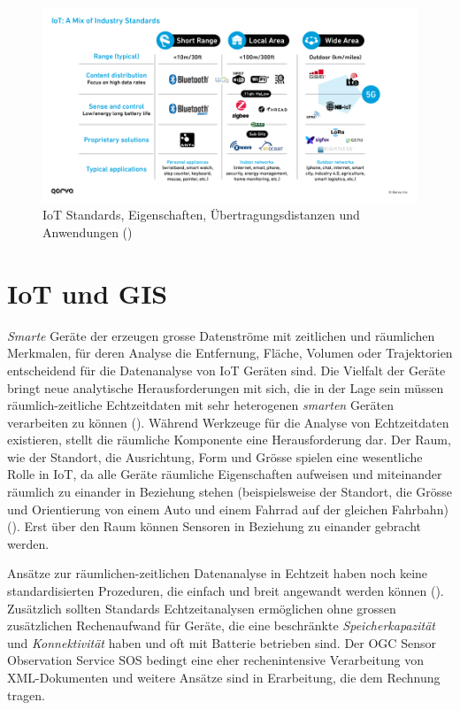 \documentclass[
  11pt,
  a4paperpaper,
  oneside, openany  ,captions=tableheading
]{scrbook}
\theoremstyle{definition}
\theoremstyle{remark}
\begin{document}
\begin{figure}[H]

{\centering \includegraphics{images/iot_standards_range.png}

}

\caption{IoT Standards, Eigenschaften, Übertragungsdistanzen und
Anwendungen ()}

\end{figure}%

\section{IoT und GIS}\label{iot-und-gis}

\emph{Smarte} Geräte der erzeugen grosse Datenströme mit zeitlichen und
räumlichen Merkmalen, für deren Analyse die Entfernung, Fläche, Volumen
oder Trajektorien entscheidend für die Datenanalyse von IoT Geräten
sind. Die Vielfalt der Geräte bringt neue analytische Herausforderungen
mit sich, die in der Lage sein müssen räumlich-zeitliche Echtzeitdaten
mit sehr heterogenen \emph{smarten} Geräten verarbeiten zu können
(). Während Werkzeuge
für die Analyse von Echtzeitdaten existieren, stellt die räumliche
Komponente eine Herausforderung dar. Der Raum, wie der Standort, die
Ausrichtung, Form und Grösse spielen eine wesentliche Rolle in IoT, da
alle Geräte räumliche Eigenschaften aufweisen und miteinander räumlich
zu einander in Beziehung stehen (beispielsweise der Standort, die Grösse
und Orientierung von einem Auto und einem Fahrrad auf der gleichen
Fahrbahn) (). Erst über
den Raum können Sensoren in Beziehung zu einander gebracht werden.

Ansätze zur räumlichen-zeitlichen Datenanalyse in Echtzeit haben noch
keine standardisierten Prozeduren, die einfach und breit angewandt
werden können ().
Zusätzlich sollten Standards Echtzeitanalysen ermöglichen ohne grossen
zusätzlichen Rechenaufwand für Geräte, die eine beschränkte
\emph{Speicherkapazität} und \emph{Konnektivität} haben und oft mit
Batterie betrieben sind. Der OGC Sensor Observation Service SOS bedingt
eine eher rechenintensive Verarbeitung von XML-Dokumenten und weitere
Ansätze sind in Erarbeitung, die dem Rechnung tragen.
\end{document}
